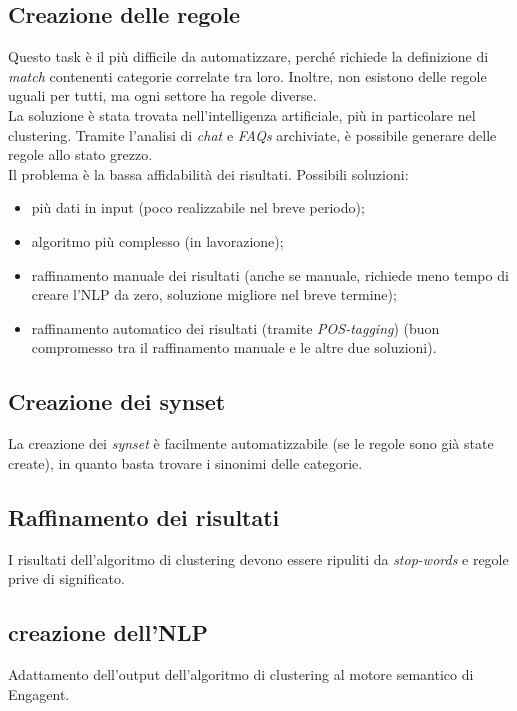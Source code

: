 \subsection{Creazione delle regole}
Questo task è il più difficile da automatizzare, perché richiede la definizione di \emph{match} contenenti categorie correlate tra loro. Inoltre, non esistono delle regole uguali per tutti, ma ogni settore ha regole diverse.\\
La soluzione è stata trovata nell'intelligenza artificiale, più in particolare nel clustering. Tramite l'analisi di \emph{chat} e \textit{FAQs} archiviate, è possibile generare delle regole allo stato grezzo.\\
Il problema è la bassa affidabilità dei risultati. Possibili soluzioni:
\begin{itemize}
    \item più dati in input (poco realizzabile nel breve periodo);
    \item algoritmo più complesso (in lavorazione);
    \item raffinamento manuale dei risultati (anche se manuale, richiede meno tempo di creare l'NLP da zero, soluzione migliore nel breve termine); 
    \item raffinamento automatico dei risultati (tramite \emph{POS-tagging}) (buon compromesso tra il raffinamento manuale e le altre due soluzioni).
\end{itemize}

\subsection{Creazione dei synset}
La creazione dei \emph{synset} è facilmente automatizzabile (se le regole sono già state create), in quanto basta trovare i sinonimi delle categorie.

\subsection{Raffinamento dei risultati}
I risultati dell'algoritmo di clustering devono essere ripuliti da \emph{stop-words} e regole prive di significato.

\subsection{creazione dell'NLP}
Adattamento dell'output dell'algoritmo di clustering al motore semantico di Engagent.

